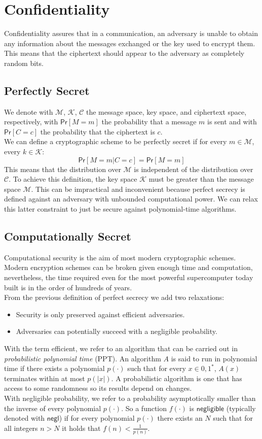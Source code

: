 \section{Confidentiality}
Confidentiality assures that in a communication, an adversary is unable to obtain any information about the messages exchanged or the key used to encrypt them. This means that the ciphertext should appear to the adversary as completely random bits.
\subsection{Perfectly Secret}
We denote with $\mathcal{M}$, $\mathcal{K}$, $\mathcal{C}$ the message space, key space, and ciphertext space, respectively,  with $\mathsf{Pr}[M = m]$ the probability that a message $m$ is sent and with $\mathsf{Pr}[C = c]$ the probability that the ciphertext is $c$.\\
We can define a cryptographic scheme to be perfectly secret if for every $m \in \mathcal{M}$, every $k \in \mathcal{K}$:
$$
    \mathsf{Pr}[M = m | C = c] = \mathsf{Pr}[M = m]
$$
This means that the distribution over $\mathcal{M}$ is independent of the distribution over $\mathcal{C}$.
To achieve this definition, the key space $\mathcal{K}$ must be greater than the message space $\mathcal{M}$. This can be impractical and inconvenient because perfect secrecy is defined against an adversary with unbounded computational power. We can relax this latter constraint to just be secure against polynomial-time algorithms.

\subsection{Computationally Secret}
Computational security is the aim of most modern cryptographic schemes. Modern encryption schemes can be broken given enough time and computation, nevertheless, the time required even for the most powerful supercomputer today built is in the order of hundreds of years.\\
From the previous definition of perfect secrecy we add two relaxations:
\begin{itemize}
    \item{Security is only preserved against efficient adversaries.}
    \item{Adversaries can potentially succeed with a negligible probability.}
\end{itemize}
With the term efficient, we refer to an algorithm that can be carried out in \emph{probabilistic polynomial time} (PPT). An algorithm $\mathit{A}$ is said to run in polynomial time if there exists a polynomial $p(\cdot)$ such that for every $x \in {0, 1}^*$, $\mathit{A}(x)$ terminates within at most $p(|x|)$. A probabilistic algorithm is one that has access to some randomness so its results depend on changes.\\
With negligible probability, we refer to a probability asymptotically smaller than the inverse of every polynomial $p(\cdot)$.
So a function $f(\cdot)$ is $\mathsf{negligible}$ (typically denoted with $\mathsf{negl}$) if for every polynomial $p(\cdot)$ there exists an $N$ such that for all integers $n > N$ it holds that $f(n) < \frac{1}{p(n)}$.

